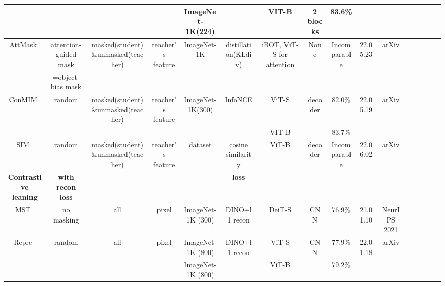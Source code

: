 \documentclass[10pt,journal,compsoc]{IEEEtran}
\begin{document}
\begin{table}[htb]
{\begin{tabular}{cccccccccccccccc}
  &  && & ImageNet-1K(224) &&   VIT-B & 2 blocks  & 83.6\% \\
\hline 
AttMask~\cite{kakogeorgiou2022hide} & attention-guided mask  & masked(student)\&unmasked(teacher) & teacher's feature & ImageNet-1K & distillation(KLdiv) & iBOT, ViT-S for attention & None & Incomparable & 22.05.23 & arXiv \\
 & =object-bias mask &  &  &  &  & &  &  &  &  \\
\hline 
ConMIM~\cite{yi2022masked} & random & masked(student)\&unmasked(teacher) & teacher's feature & ImageNet-1K(300) & InfoNCE & ViT-S & decoder & 82.0\% & 22.05.19 & arXiv \\
&  & & & & & VIT-B & &83.7\% \\
\hline 
SIM~\cite{tao2022siamese} & random & masked(student)\&unmasked(teacher) & teacher's feature & dataset & cosine similarity & ViT-B & decoder & Incomparable & 22.06.02 & arXiv \\
\hline 
\textbf{Contrastive leaning} & \textbf{with recon loss} &  &  &  & \textbf{loss} & &  &  &  &  \\
\hline 
MST~\cite{li2021mst} & no masking & all & pixel & ImageNet-1K (300) & DINO+l1 recon & DeiT-S & CNN & 76.9\% & 21.01.10 & NeurIPS 2021 \\
\hline 
Repre~\cite{wang2022repre} & random & all & pixel & ImageNet-1K (800) & DINO+l1 recon & ViT-S & CNN & 77.9\% & 22.01.18 & arXiv \\
& & & & ImageNet-1K (800) & & ViT-B & & 79.2\% & & \\ 


\end{tabular}}
\end{table}
\end{document}
